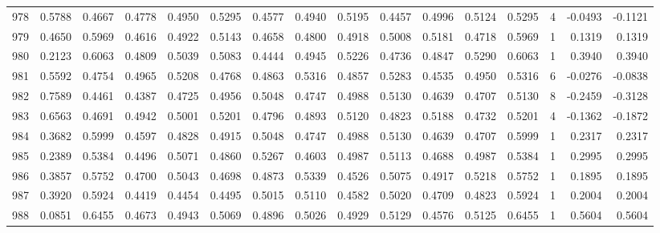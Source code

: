 \begin{tabular}{lrrrrrrrrrrrrrrr}
978 &      0.5788 &  0.4667 &  0.4778 &  0.4950 &  0.5295 &  0.4577 &  0.4940 &  0.5195 &  0.4457 &  0.4996 &   0.5124 &     0.5295 &      4 &                   -0.0493 &                    -0.1121 \\
979 &      0.4650 &  0.5969 &  0.4616 &  0.4922 &  0.5143 &  0.4658 &  0.4800 &  0.4918 &  0.5008 &  0.5181 &   0.4718 &     0.5969 &      1 &                    0.1319 &                     0.1319 \\
980 &      0.2123 &  0.6063 &  0.4809 &  0.5039 &  0.5083 &  0.4444 &  0.4945 &  0.5226 &  0.4736 &  0.4847 &   0.5290 &     0.6063 &      1 &                    0.3940 &                     0.3940 \\
981 &      0.5592 &  0.4754 &  0.4965 &  0.5208 &  0.4768 &  0.4863 &  0.5316 &  0.4857 &  0.5283 &  0.4535 &   0.4950 &     0.5316 &      6 &                   -0.0276 &                    -0.0838 \\
982 &      0.7589 &  0.4461 &  0.4387 &  0.4725 &  0.4956 &  0.5048 &  0.4747 &  0.4988 &  0.5130 &  0.4639 &   0.4707 &     0.5130 &      8 &                   -0.2459 &                    -0.3128 \\
983 &      0.6563 &  0.4691 &  0.4942 &  0.5001 &  0.5201 &  0.4796 &  0.4893 &  0.5120 &  0.4823 &  0.5188 &   0.4732 &     0.5201 &      4 &                   -0.1362 &                    -0.1872 \\
984 &      0.3682 &  0.5999 &  0.4597 &  0.4828 &  0.4915 &  0.5048 &  0.4747 &  0.4988 &  0.5130 &  0.4639 &   0.4707 &     0.5999 &      1 &                    0.2317 &                     0.2317 \\
985 &      0.2389 &  0.5384 &  0.4496 &  0.5071 &  0.4860 &  0.5267 &  0.4603 &  0.4987 &  0.5113 &  0.4688 &   0.4987 &     0.5384 &      1 &                    0.2995 &                     0.2995 \\
986 &      0.3857 &  0.5752 &  0.4700 &  0.5043 &  0.4698 &  0.4873 &  0.5339 &  0.4526 &  0.5075 &  0.4917 &   0.5218 &     0.5752 &      1 &                    0.1895 &                     0.1895 \\
987 &      0.3920 &  0.5924 &  0.4419 &  0.4454 &  0.4495 &  0.5015 &  0.5110 &  0.4582 &  0.5020 &  0.4709 &   0.4823 &     0.5924 &      1 &                    0.2004 &                     0.2004 \\
988 &      0.0851 &  0.6455 &  0.4673 &  0.4943 &  0.5069 &  0.4896 &  0.5026 &  0.4929 &  0.5129 &  0.4576 &   0.5125 &     0.6455 &      1 &                    0.5604 &                     0.5604 \\

\end{tabular}
